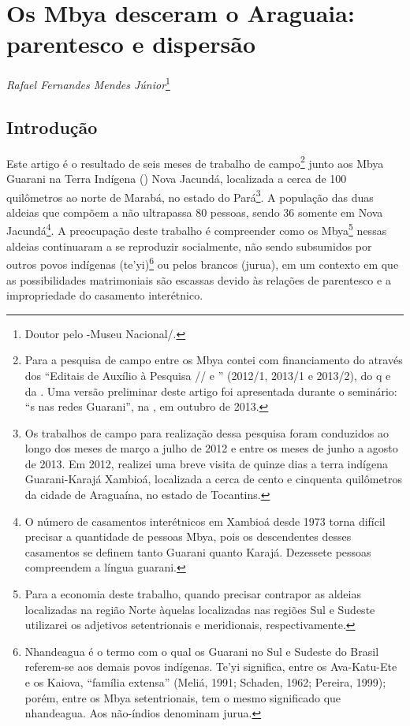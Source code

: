 {{\chapter{Os Mbya desceram o Araguaia: parentesco e dispersão}
\begin{flushright}
\emph{Rafael Fernandes Mendes Júnior}\footnote{Doutor pelo -Museu
Nacional/.}
\end{flushright}
\medskip

\section{Introdução}

Este artigo é o resultado de seis meses de trabalho de
campo\footnote{Para a pesquisa de campo entre os Mbya contei com
financiamento do  através dos ``Editais de Auxílio à Pesquisa
// e '' (2012/1, 2013/1 e 2013/2), do q e da .
Uma versão preliminar deste artigo foi apresentada durante o seminário:
``s nas redes Guarani'', na , em outubro de 2013.} junto aos Mbya
Guarani na Terra Indígena () Nova Jacundá, localizada a cerca de 100
quilômetros ao norte de Marabá, no estado do Pará\footnote{Os trabalhos
de campo para realização dessa pesquisa foram conduzidos ao longo dos
meses de março a julho de 2012 e entre os meses de junho a agosto de
2013. Em 2012, realizei uma breve visita de quinze dias a terra
indígena Guarani-Karajá Xambioá, localizada a cerca de cento e
cinquenta quilômetros da cidade de Araguaína, no estado de Tocantins.}.
A população das duas aldeias que compõem a  não ultrapassa 80
pessoas, sendo 36 somente em Nova Jacundá\footnote{O número de
casamentos interétnicos em Xambioá desde 1973 torna difícil precisar a
quantidade de pessoas Mbya, pois os descendentes desses casamentos se
definem tanto Guarani quanto Karajá. Dezessete pessoas compreendem a
língua guarani.}. A preocupação deste trabalho é compreender como os
Mbya\footnote{Para a economia deste trabalho, quando precisar contrapor
as aldeias localizadas na região Norte àquelas localizadas nas regiões
Sul e Sudeste utilizarei os adjetivos setentrionais e meridionais,
respectivamente.} nessas aldeias continuaram a se reproduzir
socialmente, não sendo subsumidos por outros povos indígenas
(te’yi)\footnote{Nhandeagua é o termo com o qual os Guarani no Sul e
Sudeste do Brasil referem-se aos demais povos indígenas. Te’yi
significa, entre os Ava-Katu-Ete e os Kaiova, ``família extensa'' (Meliá,
1991; Schaden, 1962; Pereira, 1999); porém, entre os Mbya setentrionais,
tem o mesmo significado que nhandeagua. Aos não-índios denominam
jurua.} ou pelos brancos (jurua), em um contexto em que as
possibilidades matrimoniais são escassas devido às relações de
parentesco e a impropriedade do casamento interétnico.

}}
